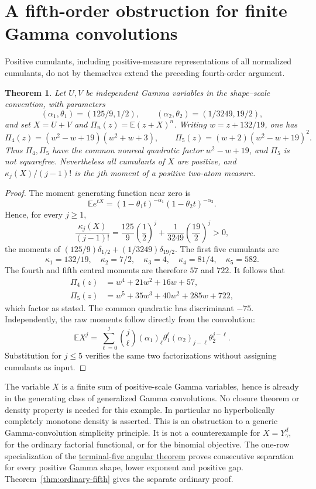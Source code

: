 \documentclass[11pt]{article}
\newtheorem{theorem}{Theorem}
\begin{document}
\section{A fifth-order obstruction for finite Gamma convolutions}
Positive cumulants, including positive-measure representations of all
normalized cumulants, do not by themselves extend the preceding
fourth-order argument.
\begin{theorem}\label{thm:gamma-convolution-obstruction}
Let $U,V$ be independent Gamma variables in the shape--scale convention,
with parameters
\[
 (\alpha_1,\theta_1)=(125/9,1/2),\qquad
 (\alpha_2,\theta_2)=(1/3249,19/2),
\]
and set $X=U+V$ and $\Pi_n(z)=\mathbb E(z+X)^n$.
Writing $w=z+132/19$, one has
\[
 \Pi_4(z)=(w^2-w+19)(w^2+w+3),\qquad
 \Pi_5(z)=(w+2)(w^2-w+19)^2.
\]
Thus $\Pi_4,\Pi_5$ have the common nonreal quadratic factor
$w^2-w+19$, and $\Pi_5$ is not squarefree.
Nevertheless all cumulants of $X$ are positive, and
$\kappa_j(X)/(j-1)!$ is the $j$th moment of a positive two-atom measure.
\end{theorem}
\begin{proof}
The moment generating function near zero is
\[
 \mathbb E e^{tX}
  =(1-\theta_1t)^{-\alpha_1}(1-\theta_2t)^{-\alpha_2}.
\]
Hence, for every $j\ge1$,
\[
 \frac{\kappa_j(X)}{(j-1)!}
 =\frac{125}{9}\left(\frac12\right)^j
  +\frac1{3249}\left(\frac{19}{2}\right)^j>0,
\]
the moments of
$(125/9)\delta_{1/2}+(1/3249)\delta_{19/2}$.
The first five cumulants are
\[
 \kappa_1=132/19,\quad \kappa_2=7/2,\quad
 \kappa_3=4,\quad \kappa_4=81/4,\quad \kappa_5=582.
\]
The fourth and fifth central moments are therefore $57$ and $722$.
It follows that
\[
 \begin{split}
 \Pi_4(z)&=w^4+21w^2+16w+57,\\
 \Pi_5(z)&=w^5+35w^3+40w^2+285w+722,
 \end{split}
\]
which factor as stated. The common quadratic has discriminant $-75$.
Independently, the raw moments follow directly from the convolution:
\[
 \mathbb E X^j=\sum_{\ell=0}^j\binom j\ell
       (\alpha_1)_\ell\theta_1^\ell
       (\alpha_2)_{j-\ell}\theta_2^{j-\ell}.
\]
Substitution for $j\le5$ verifies the same two factorizations without
assigning cumulants as input.
\end{proof}

The variable $X$ is a finite sum of positive-scale Gamma variables,
hence is already in the generating class of generalized Gamma
convolutions. No closure theorem or density property is needed for
this example. In particular no hyperbolically completely monotone
density is asserted.
This is an obstruction to a generic Gamma-convolution simplicity
principle. It is not a counterexample for $X=Y_\gamma^d$, for the
ordinary factorial functional, or for the binomial objective.
The one-row specialization of the \href{MULTIVARIATE_TERMINAL_FIVE_ANGULAR_SEPARATION.md}{terminal-five angular theorem} proves consecutive separation for every positive Gamma shape, lower exponent and positive gap. Theorem~\ref{thm:ordinary-fifth} gives the separate ordinary proof.
\end{document}
